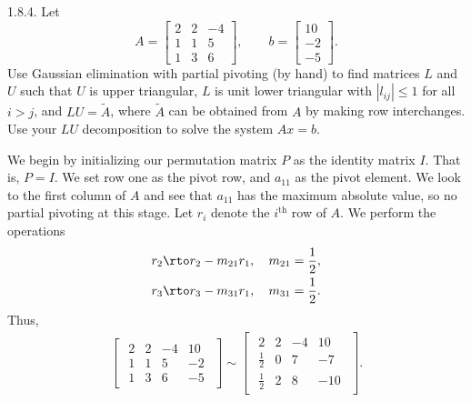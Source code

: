 \documentclass{report}
\begin{document}
    \pagebreak \bigbreak \noindent 
    \begin{mdframed}
        1.8.4. Let 
        \[
            A = 
            \begin{bmatrix}
                2 & 2 & -4 \\
                1 & 1 & 5 \\
                1 & 3 & 6
            \end{bmatrix},
            \qquad
            b =
            \begin{bmatrix}
                10 \\
                -2 \\
                -5
            \end{bmatrix}.
        \]
        Use Gaussian elimination with partial pivoting (by hand) to find matrices $L$ and $U$ such that $U$ is upper triangular, $L$ is unit lower triangular with $|l_{ij}| \leq 1$ for all $i > j$, and $LU = \tilde{A}$, where $\tilde{A}$ can be obtained from $A$ by making row interchanges. Use your $LU$ decomposition to solve the system $Ax = b$.
    \end{mdframed}
    \bigbreak \noindent 
    We begin by initializing our permutation matrix $P$ as the identity matrix $I$. That is, $P = I$. We set row one as the pivot row, and $a_{11}$ as the pivot element. We look to the first column of $A$ and see that $a_{11}$ has the maximum absolute value, so no partial pivoting at this stage.
    \bigbreak \noindent 
    Let $r_{i}$ denote the $i^{\text{th}}$ row of $A$. We perform the operations
    \begin{align*}
        &r_{2} \rto r_{2} - m_{21}r_{1}, \quad m_{21} = \frac{1}{2}, \\
        &r_{3} \rto r_{3} - m_{31}r_{1}, \quad m_{31} = \frac{1}{2}
    .\end{align*}
    Thus,
    \begin{align*}
        \begin{bmatrix}
            \begin{array}{ccc|c}
                2 & 2 & -4 & 10 \\
                1 & 1 & 5 & -2 \\
                1 & 3 & 6 & -5
            \end{array}
        \end{bmatrix}
        \sim
        \begin{bmatrix}
            \begin{array}{ccc|c}
                2 & 2 & -4 & 10 \\
                \boxed{\frac{1}{2}} & 0 & 7 & -7 \\
                \boxed{\frac{1}{2}}& 2 & 8 & -10
           \end{array}
        \end{bmatrix}
    .\end{align*}
\end{document}
